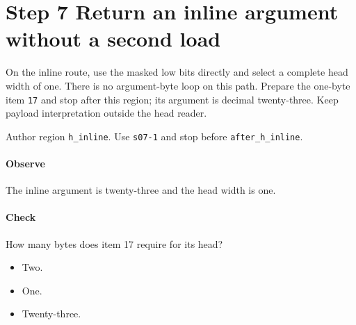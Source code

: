 \section{Step 7 Return an inline argument without a second load}\label{cbor-s07}
On the inline route, use the masked low bits directly and select a complete head width of one. There is no argument-byte loop on this path. Prepare the one-byte item \texttt{17} and stop after this region; its argument is decimal twenty-three. Keep payload interpretation outside the head reader.

Author region \texttt{h\_inline}. Use \texttt{s07-1} and stop before \texttt{after\_h\_inline}.

\paragraph{Observe} The inline argument is twenty-three and the head width is one.

\paragraph{Check} How many bytes does item 17 require for its head?
\begin{itemize}
  \item[A.] Two.
  \item[B.] One.
  \item[C.] Twenty-three.
\end{itemize}

